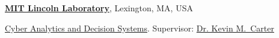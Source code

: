 


\halfblankline



%
%
%
%
%
%
%
%
%
%
%
%
%
%
%








\href{http://www.ll.mit.edu/}{\textbf{MIT Lincoln Laboratory}},
Lexington, MA, USA

\href{https://www.ll.mit.edu/mission/cybersec/CADS/CADS.html}
{Cyber Analytics and Decision Systems}.
Supervisor:
\href{https://www.ll.mit.edu/mission/cybersec/cybersec-bios/carter-bio.html}
{Dr. Kevin M.~Carter}

\vspace{-0.5em}

